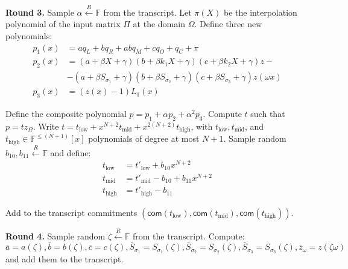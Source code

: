 \documentclass[../lecture-notes-148x210.tex]{subfiles}
\begin{document}
\textcolor{green!60!black}{\textbf{Round 3.}} Sample $\alpha \xleftarrow{R}
\mathbb{F}$ from the transcript. Let $\pi(X)$ be the interpolation polynomial of the
input matrix $\Pi$ at the domain $\Omega$. Define three new polynomials:
\begin{align*}
p_1(x) &= aq_L + bq_R + abq_M + cq_O + q_C + \pi \\
p_2(x) &= (a + \beta X + \gamma)(b + \beta k_1 X + \gamma)(c + \beta k_2 X + \gamma)z - \\
    &- (a + \beta S_{\sigma_1} + \gamma)(b + \beta S_{\sigma_2} + \gamma)(c + \beta S_{\sigma_3} + \gamma)z(\omega x) \\
p_3(x) &= (z(x) - 1)L_1(x)
\end{align*}

Define the composite polynomial $p = p_1 + \alpha p_2 + \alpha^2 p_3$. Compute
$t$ such that $p = tz_{\Omega}$. Write $t = t_{\text{low}} +
x^{N+2}t_{\text{mid}} + x^{2(N+2)}t_{\text{high}}$, with $t_{\text{low}},
t_{\text{mid}}$, and $t_{\text{high}} \in \mathbb{F}^{\leq (N+1)}[x]$
polynomials of degree at most $N+1$. Sample random $b_{10}, b_{11}
\xleftarrow{R} \mathbb{F}$ and define:
\begin{align*}
t_{\text{low}} &= t'_{\text{low}} + b_{10}x^{N+2} \\
t_{\text{mid}} &= t'_{\text{mid}} - b_{10} + b_{11}x^{N+2} \\
t_{\text{high}} &= t'_{\text{high}} - b_{11}
\end{align*}

Add to the transcript commitments $(\mathsf{com}(t_{\text{low}}), \mathsf{com}(t_{\text{mid}}), \mathsf{com}(t_{\text{high}}))$.

\textcolor{green!60!black}{\textbf{Round 4.}} Sample random $\zeta \xleftarrow{R}
\mathbb{F}$ from the transcript. Compute:
\[\bar{a} = a(\zeta), \bar{b} = b(\zeta), \bar{c} = c(\zeta), \bar{S}_{\sigma_1} = S_{\sigma_1}(\zeta), \bar{S}_{\sigma_2} = S_{\sigma_2}(\zeta), \bar{S}_{\sigma_3} = S_{\sigma_3}(\zeta), \bar{z}_{\omega} = z(\zeta \omega)\]
and add them to the transcript.
\end{document}
